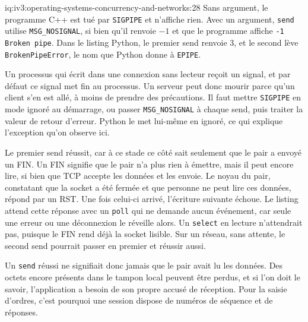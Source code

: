 \begin{solution}{iq:iv3:operating-systems-concurrency-and-networks:28}
Sans argument, le programme C++ est tué par \texttt{SIGPIPE} et n'affiche rien. Avec un argument, \texttt{send} utilise \texttt{MSG\_NOSIGNAL}, si bien qu'il renvoie $-1$ et que le programme affiche \texttt{-1 Broken pipe}. Dans le listing Python, le premier send renvoie 3, et le second lève \texttt{BrokenPipeError}, le nom que Python donne à \texttt{EPIPE}.

Un processus qui écrit dans une connexion sans lecteur reçoit un signal, et par défaut ce signal met fin au processus. Un serveur peut donc mourir parce qu'un client s'en est allé, à moins de prendre des précautions. Il faut mettre \texttt{SIGPIPE} en mode ignoré au démarrage, ou passer \texttt{MSG\_NOSIGNAL} à chaque send, puis traiter la valeur de retour d'erreur. Python le met lui-même en ignoré, ce qui explique l'exception qu'on observe ici.

Le premier send réussit, car à ce stade ce côté sait seulement que le pair a envoyé un FIN. Un FIN signifie que le pair n'a plus rien à émettre, mais il peut encore lire, si bien que TCP accepte les données et les envoie. Le noyau du pair, constatant que la socket a été fermée et que personne ne peut lire ces données, répond par un RST. Une fois celui-ci arrivé, l'écriture suivante échoue. Le listing attend cette réponse avec un \texttt{poll} qui ne demande aucun événement, car seule une erreur ou une déconnexion le réveille alors. Un \texttt{select} en lecture n'attendrait pas, puisque le FIN rend déjà la socket lisible. Sur un réseau, sans attente, le second send pourrait passer en premier et réussir aussi.

Un \texttt{send} réussi ne signifiait donc jamais que le pair avait lu les données. Des octets encore présents dans le tampon local peuvent être perdus, et si l'on doit le savoir, l'application a besoin de son propre accusé de réception. Pour la saisie d'ordres, c'est pourquoi une session dispose de numéros de séquence et de réponses.

\end{solution}

